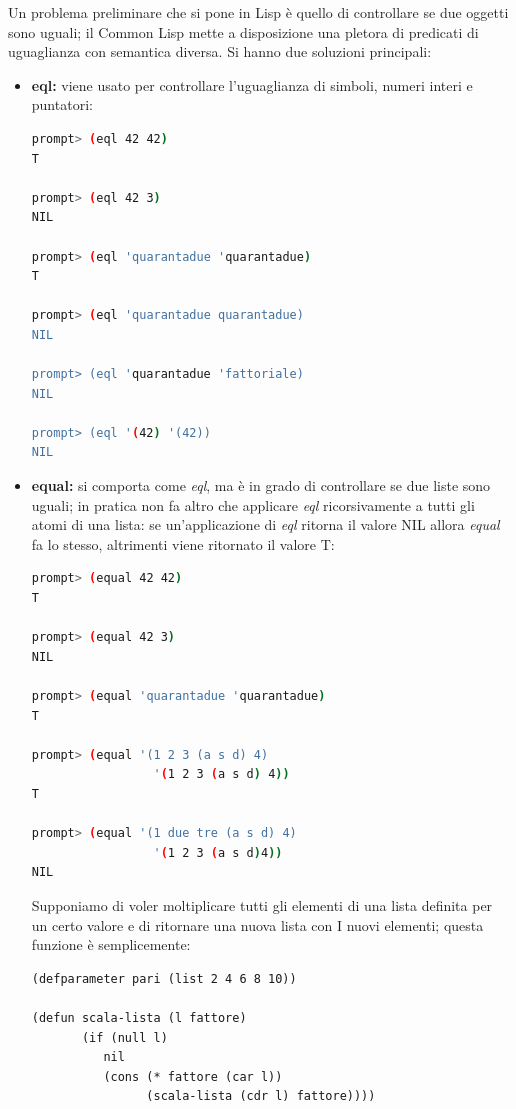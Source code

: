 \documentclass[a4paper,12pt, oneside]{book}
\begin{document}
Un problema preliminare che si pone in Lisp è quello di
controllare se due oggetti sono uguali; il Common Lisp mette a disposizione una pletora di predicati di uguaglianza con
semantica diversa. Si hanno due soluzioni principali:
\begin{itemize}
\item \textbf{eql:} viene usato per controllare l'uguaglianza di simboli, numeri interi e puntatori:
\begin{shaded}
\begin{lstlisting}[language=bash]
prompt> (eql 42 42)
T

prompt> (eql 42 3)
NIL

prompt> (eql 'quarantadue 'quarantadue)
T

prompt> (eql 'quarantadue quarantadue)
NIL

prompt> (eql 'quarantadue 'fattoriale)
NIL

prompt> (eql '(42) '(42))
NIL
\end{lstlisting}
\end{shaded}
\item \textbf{equal:} si comporta come \textit{eql}, ma è in grado di controllare se due liste sono uguali; in pratica non fa altro che applicare \textit{eql} ricorsivamente a tutti
gli atomi di una lista: se un'applicazione di \textit{eql} ritorna il valore NIL allora \textit{equal} fa lo stesso, altrimenti viene ritornato il valore T:
\begin{shaded}
\begin{lstlisting}[language=bash]
prompt> (equal 42 42)
T

prompt> (equal 42 3)
NIL

prompt> (equal 'quarantadue 'quarantadue)
T

prompt> (equal '(1 2 3 (a s d) 4) 
                 '(1 2 3 (a s d) 4))
T

prompt> (equal '(1 due tre (a s d) 4) 
                 '(1 2 3 (a s d)4))
NIL
\end{lstlisting}
\end{shaded}
Supponiamo di voler moltiplicare tutti gli elementi di una lista definita per un certo valore e di ritornare una nuova lista con I nuovi elementi; questa
funzione è semplicemente:
\begin{verbatim}
(defparameter pari (list 2 4 6 8 10))

(defun scala-lista (l fattore)
       (if (null l)
          nil
          (cons (* fattore (car l))
                (scala-lista (cdr l) fattore))))
\end{verbatim}
\end{itemize}
\end{document}
